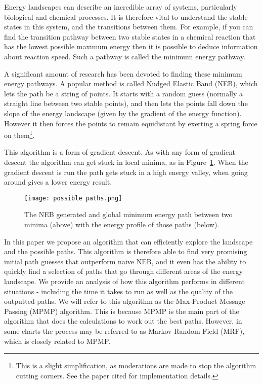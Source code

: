 Energy landscapes can describe an incredible array of systems, particularly biological and chemical processes.
It is therefore vital to understand the stable states in this system, and the transitions between them.
For example, if you can find the transition pathway between two stable states in a chemical reaction that has the lowest possible maximum energy then it is possible to deduce information about reaction speed.
Such a pathway is called the minimum energy pathway.

A significant amount of research has been devoted to finding these minimum energy pathways.
A popular method is called Nudged Elastic Band (NEB), which lets the path be a string of points.
It starts with a random guess (normally a straight line between two stable points), and then lets the points fall down the slope of the energy landscape (given by the gradient of the energy function).
However it then forces the points to remain equidistant by exerting a spring force on them\footnote{This is a slight simplification, as moderations are made to stop the algorithm cutting corners. See the paper cited for implementation details.}.

This algorithm is a form of gradient descent.
As with any form of gradient descent the algorithm can get stuck in local minima, as in Figure~\ref{fig:global_local_min}.
When the gradient descent is run the path gets stuck in a high energy valley, when going around gives a lower energy result.

\begin{figure}[h]
    \centering
    \texttt{[image: possible paths.png]}
    \caption{The NEB generated and global minimum energy path between two minima (above) with the energy profile of those paths (below).}
    \label{fig:global_local_min}
\end{figure}

In this paper we propose an algorithm that can efficiently explore the landscape and the possible paths.
This algorithm is therefore able to find very promising initial path guesses that outperform naive NEB, and it even has the ability to quickly find a selection of paths that go through different areas of the energy landscape.
We provide an analysis of how this algorithm performs in different situations - including the time it takes to run as well as the quality of the outputted paths.
We will refer to this algorithm as the Max-Product Message Passing (MPMP) algorithm.
This is because MPMP is the main part of the algorithm that does the calculations to work out the best paths.
However, in some charts the process may be referred to as Markov Random Field (MRF), which is closely related to MPMP\@.

